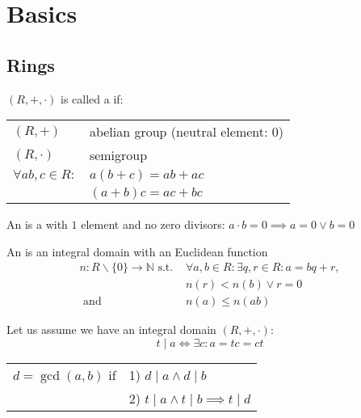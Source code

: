 
\section{Basics}


\subsection{Rings}
\begin{definition}
$(R,+,\cdot)$ is called a  if:

\begin{center}
\begin{tabular}{ll}
  $(R,+)$ & abelian group (neutral element: 0)\\
  $(R,\cdot)$ & semigroup \\
  $\forall ab,c \in R:$ & $a(b+c) = ab+ac$\\
                        & $(a+b)c = ac+bc$\\
\end{tabular}
\end{center}
\end{definition}

\begin{definition}
An  is a  with $1$ element and no zero divisors: $a\cdot b = 0 \implies a=0 \lor b = 0$
\end{definition}

\begin{definition}
An  is an integral domain with an Euclidean function
\begin{align*}
  n: R \backslash \{0\} \rightarrow \mathbb{N} \text{ s.t. } &\forall a,b \in R: \exists q,r \in R: a = bq + r, \\
  &n(r) < n(b) \lor r=0 \\
  \text{ and } &n(a) \leq n(ab)
\end{align*}
\end{definition}

Let us assume we have an integral domain $(R,+, \cdot)$:\\
\[ t∣a \Leftrightarrow \exists c: a=tc =ct \]
\begin{center}
\begin{tabular}{ll}
$d=\gcd(a,b)$ if & 1) $d∣a \land d∣b$ \\
  & 2) $t∣a \land t∣b \implies t∣d$
\end{tabular}
\end{center}

